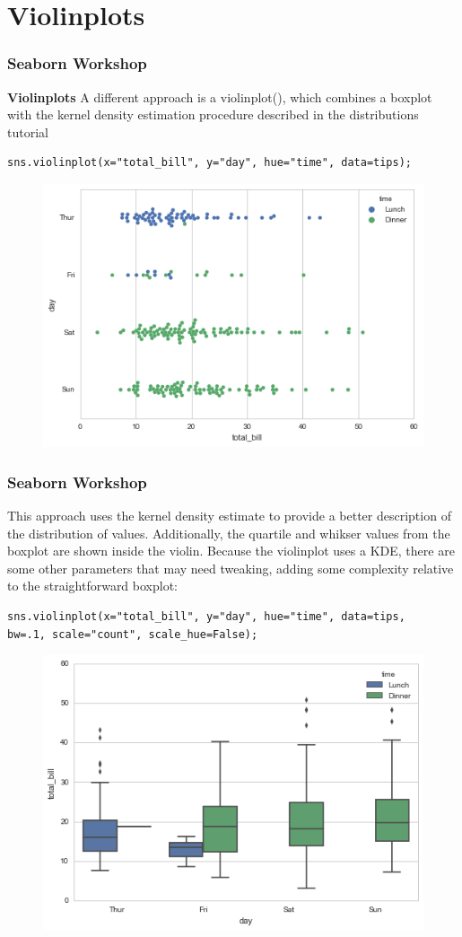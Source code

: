 \documentclass{beamer}
\begin{document}
\section{Violinplots}
\begin{frame}[fragile]
\frametitle{Seaborn Workshop}
\large
\noindent \textbf{Violinplots}
A different approach is a violinplot(), which combines a boxplot with the kernel density estimation procedure described in the distributions tutorial
\begin{verbatim}
sns.violinplot(x="total_bill", y="day", hue="time", data=tips);
\end{verbatim}
\begin{figure}
	\centering
	\includegraphics[width=0.7\linewidth]{images/categorical_19_0}
\end{figure}
\end{frame}
\begin{frame}[fragile]
\frametitle{Seaborn Workshop}
\large
This approach uses the kernel density estimate to provide a better description of the distribution of values. Additionally, the quartile and whikser values from the boxplot are shown inside the violin. Because the violinplot uses a KDE, there are some other parameters that may need tweaking, adding some complexity relative to the straightforward boxplot:
\begin{verbatim}
sns.violinplot(x="total_bill", y="day", hue="time", data=tips,
bw=.1, scale="count", scale_hue=False);
\end{verbatim}

\begin{figure}
\centering
\includegraphics[width=0.7\linewidth]{images/categorical_21_0}
\end{figure}

\end{frame}
\end{document}
